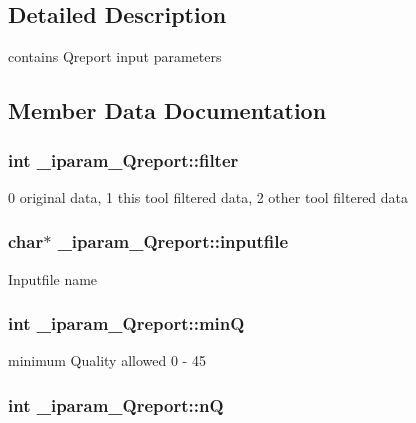 \subsection{Detailed Description}
contains Qreport input parameters 

\subsection{Member Data Documentation}
\hypertarget{struct__iparam__Qreport_ae1ce417a16c5d30c05a09ec868154e14}{
\subsubsection[{filter}]{\setlength{\rightskip}{0pt plus 5cm}int \+\_\+iparam\+\_\+\+Qreport\+::filter}}\label{struct__iparam__Qreport_ae1ce417a16c5d30c05a09ec868154e14}
0 original data, 1 this tool filtered data, 2 other tool filtered data \hypertarget{struct__iparam__Qreport_ac96f6463d81dc1fcc41850564f24cf11}{
\subsubsection[{inputfile}]{\setlength{\rightskip}{0pt plus 5cm}char$\ast$ \+\_\+iparam\+\_\+\+Qreport\+::inputfile}}\label{struct__iparam__Qreport_ac96f6463d81dc1fcc41850564f24cf11}
Inputfile name \hypertarget{struct__iparam__Qreport_a1fa54b38e988ffe30eba5e0284e9dacb}{
\subsubsection[{min\+Q}]{\setlength{\rightskip}{0pt plus 5cm}int \+\_\+iparam\+\_\+\+Qreport\+::min\+Q}}\label{struct__iparam__Qreport_a1fa54b38e988ffe30eba5e0284e9dacb}
minimum Quality allowed 0 -\/ 45 \hypertarget{struct__iparam__Qreport_a47cfa018e6e957cb132e22876a400a1f}{
\subsubsection[{n\+Q}]{\setlength{\rightskip}{0pt plus 5cm}int \+\_\+iparam\+\_\+\+Qreport\+::n\+Q}}\label{struct__iparam__Qreport_a47cfa018e6e957cb132e22876a400a1f}
